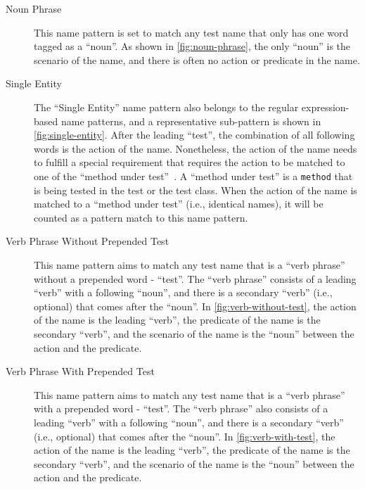 \documentclass[proposal.tex]{subfiles}
\begin{document}
\begin{description}
\item[Noun Phrase]


This name pattern is set to match any test name that only has one word tagged as a \enquote{noun}.
%
As shown in \cref{fig:noun-phrase}, the only \enquote{noun} is the scenario of the name, and there is often no action or predicate in the name.


\item[Single Entity]

The \enquote{Single Entity} name pattern also belongs to the regular expression-based name patterns, and a representative sub-pattern is shown in \cref{fig:single-entity}.
%
After the leading \enquote{test}, the combination of all following words is the action of the name.
%
Nonetheless, the action of the name needs to fulfill a special requirement that requires the action to be matched to one of the \enquote{method under test}~\cite{zhang2016towards}.
%
A \enquote{method under test} is a \texttt{method} that is being tested in the test or the test class.
%
When the action of the name is matched to a \enquote{method under test} (i.e., identical names), it will be counted as a pattern match to this name pattern.


\item[Verb Phrase Without Prepended Test]

This name pattern aims to match any test name that is a \enquote{verb phrase} without a prepended word - \enquote{test}.
%
The \enquote{verb phrase} consists of a leading \enquote{verb} with a following \enquote{noun}, and there is a secondary \enquote{verb} (i.e., optional) that comes after the \enquote{noun}.
%
In \cref{fig:verb-without-test}, the action of the name is the leading \enquote{verb}, the predicate of the name is the secondary \enquote{verb}, and the scenario of the name is the \enquote{noun} between the action and the predicate.

\item[Verb Phrase With Prepended Test]

This name pattern aims to match any test name that is a \enquote{verb phrase} with a prepended word - \enquote{test}.
%
The \enquote{verb phrase} also consists of a leading \enquote{verb} with a following \enquote{noun}, and there is a secondary \enquote{verb} (i.e., optional) that comes after the \enquote{noun}.
%
In \cref{fig:verb-with-test}, the action of the name is the leading \enquote{verb}, the predicate of the name is the secondary \enquote{verb}, and the scenario of the name is the \enquote{noun} between the action and the predicate.



\end{description}
\end{document}
